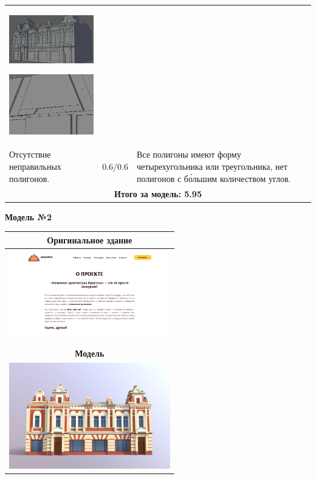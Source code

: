 \begin{longtable}{|l|l|l|}
    \includegraphics[width=7cm]{norm_1}

    \includegraphics[width=7cm]{norm_2}\\
    Отсутствие неправильных полигонов. & 0.6/0.6 & Все полигоны имеют форму четырехугольника или треугольника, нет полигонов с бо́льшим количеством углов. \\
    \hline
    \multicolumn{3}{|c|}{\textbf{Итого за модель: 5.95}} \\
    \hline
\end{longtable}

\begin{center}
    \textbf{Модель №2}
\end{center}

\begin{longtable}{|l|l|l|}
    \hline
    \multicolumn{3}{|c|}{\textbf{Оригинальное здание} } \\
    \hline
    \multicolumn{3}{|c|}{\includegraphics[width=7cm]{1}} \\
    \hline
    \multicolumn{3}{|c|}{\textbf{Модель}} \\
    \hline
    \multicolumn{3}{|c|}{\includegraphics[width=7cm]{model_1}} \\
    \hline
\end{longtable}